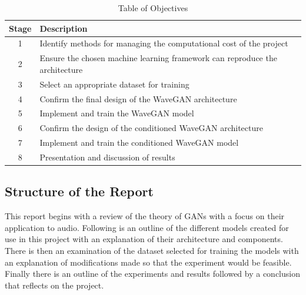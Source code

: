 \documentclass[a4paper, titlepage]{article}
\begin{document}
\begin{table}[ht]
    
    \caption{Table of Objectives}
    \label{tab:WGAN_LAM}
    
    \begin{center}
      {\renewcommand{\arraystretch}{1.5}%
      \begin{tabular}{ | c| l | }

        \hline
        Stage & Description \\
        \hline
        1 & Identify methods for managing the computational cost of the project \\
        \hline
        2 & Ensure the chosen machine learning framework can reproduce the architecture \\
        \hline
        3 & Select an appropriate dataset for training \\
        \hline
        4 & Confirm the final design of the WaveGAN architecture \\
        \hline
        5 & Implement and train the WaveGAN model \\
        \hline
        6 & Confirm the design of the conditioned WaveGAN architecture \\
        \hline
        7  & Implement and train the conditioned WaveGAN model \\
        \hline
        8 & Presentation and discussion of results \\
        \hline
        
      \end{tabular}}
    \end{center}
    
  \end{table}

\subsection{Structure of the Report}

This report begins with a review of the theory of \ac{GAN}s with a focus on their application to audio.
Following is an outline of the different models created for use in this project with an explanation of their architecture and components.
There is then an examination of the dataset selected for training the models with an explanation of modifications made so that the experiment would be feasible.
Finally there is an outline of the experiments and results followed by a conclusion that reflects on the project.
\end{document}
